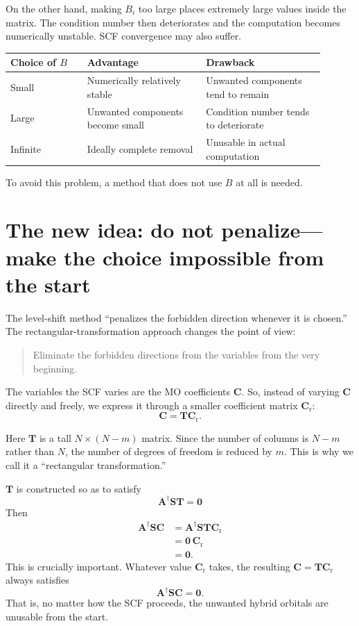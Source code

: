 \documentclass[11pt]{article}
\newcommand{\Smat}{\mathbf S}
\newcommand{\Amat}{\mathbf A}
\newcommand{\Tmat}{\mathbf T}
\newcommand{\Cmat}{\mathbf C}
\newcommand{\Cr}{\mathbf C_{\mathrm r}}
\begin{document}
On the other hand, making \(B_i\) too large places extremely large
values inside the matrix. The condition number then deteriorates and
the computation becomes numerically unstable. SCF convergence may also
suffer.

\begin{center}
\begin{tabular}{|p{0.22\linewidth}|p{0.34\linewidth}|p{0.34\linewidth}|}
\hline
\textbf{Choice of \(B\)} & \textbf{Advantage} & \textbf{Drawback} \\
\hline
Small & Numerically relatively stable & Unwanted components tend to remain \\
\hline
Large & Unwanted components become small & Condition number tends to deteriorate \\
\hline
Infinite & Ideally complete removal & Unusable in actual computation \\
\hline
\end{tabular}
\end{center}

To avoid this problem, a method that does not use \(B\) at all is
needed.

\section{The new idea: do not penalize---make the choice impossible
from the start}

The level-shift method ``penalizes the forbidden direction whenever it
is chosen.'' The rectangular-transformation approach changes the point
of view:

\begin{quote}
Eliminate the forbidden directions from the variables from the very
beginning.
\end{quote}

The variables the SCF varies are the MO coefficients \(\Cmat\). So,
instead of varying \(\Cmat\) directly and freely, we express it through
a smaller coefficient matrix \(\Cr\):
\[
  \Cmat = \Tmat\Cr .
\]

Here \(\Tmat\) is a tall \(N\times(N-m)\) matrix. Since the number of
columns is \(N-m\) rather than \(N\), the number of degrees of freedom
is reduced by \(m\). This is why we call it a ``rectangular
transformation.''

\(\Tmat\) is constructed so as to satisfy
\[
  \boxed{\Amat^\dagger\Smat\Tmat=\mathbf 0}
\]
Then
\begin{align*}
  \Amat^\dagger\Smat\Cmat
  &=
  \Amat^\dagger\Smat\Tmat\Cr \\
  &=
  \mathbf 0\,\Cr \\
  &=
  \mathbf 0 .
\end{align*}
This is crucially important. Whatever value \(\Cr\) takes, the
resulting \(\Cmat=\Tmat\Cr\) always satisfies
\[
  \Amat^\dagger\Smat\Cmat=\mathbf 0 .
\]
That is, no matter how the SCF proceeds, the unwanted hybrid orbitals
are unusable from the start.
\end{document}
